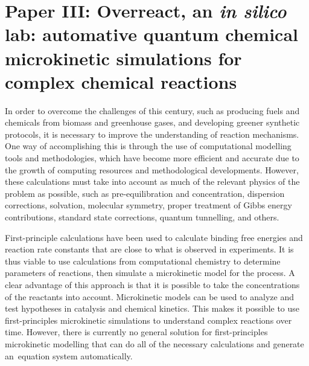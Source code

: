 \chapter{Paper III:\@
  Overreact,
  an \emph{in silico} lab:
  \linebreak
  automative quantum chemical microkinetic simulations
  for complex chemical reactions
 }%
\label{ch:paper3}

\begin{citacao}
\end{citacao}

In order to overcome the challenges of this century,
such as producing fuels and chemicals from biomass and greenhouse gases,
and developing greener synthetic protocols,
it is necessary to improve the understanding of reaction mechanisms.
One way of accomplishing this is through the use of computational modelling tools and methodologies,
which have become more efficient and accurate due to the growth of computing resources and methodological developments.
However,
these calculations must take into account as much of the relevant physics of the problem as possible,
such as pre-equilibration and concentration,
dispersion corrections,
solvation,
molecular symmetry,
proper treatment of Gibbs energy contributions,
standard state corrections,
quantum tunnelling,
and others.

First-principle calculations have been used to calculate binding free energies
and reaction rate constants that are close to what is observed in experiments.
It is thus viable to use calculations from computational chemistry to determine parameters of reactions,
then simulate a microkinetic model for the process.
A clear advantage of this approach is that it is possible to take the concentrations of the reactants into account.
Microkinetic models can be used to analyze and test hypotheses in catalysis and chemical kinetics.
This makes it possible to use first-principles microkinetic simulations to understand complex reactions over time.
However,
there is currently no general solution for first-principles microkinetic modelling
that can do all of the necessary calculations and generate an~equation system automatically.

